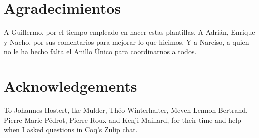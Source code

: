 
\chapter*{Agradecimientos}

A Guillermo, por el tiempo empleado en hacer estas plantillas. A Adrián, Enrique y Nacho, por sus comentarios para mejorar lo que hicimos. Y a Narciso, a quien no le ha hecho falta el Anillo Único para coordinarnos a todos.

\chapter*{Acknowledgements}
To Johannes Hostert, Ike Mulder, Théo Winterhalter, Meven Lennon-Bertrand, Pierre-Marie Pédrot, Pierre Roux and Kenji Maillard, for their time and help when I asked questions in Coq's Zulip chat.











